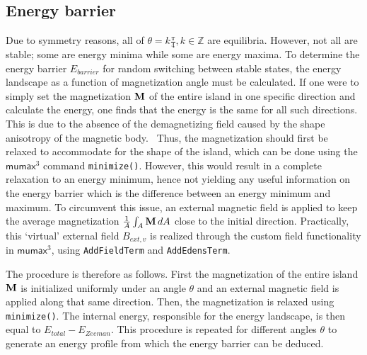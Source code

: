 \documentclass[12pt,a4paper]{article}
\newcommand{\code}[1]{\texttt{#1}}
\newcommand{\mumax}{$\mathsf{mumax}^3$}
\begin{document}
\subsection{Energy barrier}
Due to symmetry reasons, all of $\theta = k\frac{\pi}{4} , k\in\mathbb{Z}$ are equilibria. However, not all are stable; some are energy minima while some are energy maxima. To determine the energy barrier $E_{barrier}$ for random switching between stable states, the energy landscape as a function of magnetization angle must be calculated. If one were to simply set the magnetization $\vb{M}$ of the entire island in one specific direction and calculate the energy, one finds that the energy is the same for all such directions. This is due to the absence of the demagnetizing field caused by the shape anisotropy of the magnetic body.~\cite{Nonmonotonic_reversal} Thus, the magnetization should first be relaxed to accommodate for the shape of the island, which can be done using the \mumax{} command \code{minimize()}. However, this would result in a complete relaxation to an energy minimum, hence not yielding any useful information on the energy barrier which is the difference between an energy minimum and maximum. To circumvent this issue, an external magnetic field is applied to keep the average magnetization $\frac{1}{A}\int_A \vb{M}\,dA$ close to the initial direction. Practically, this `virtual' external field $B_{ext,v}$ is realized through the custom field functionality in \mumax{}, using \code{AddFieldTerm} and \code{AddEdensTerm}. \par
The procedure is therefore as follows. First the magnetization of the entire island $\vb{M}$ is initialized uniformly under an angle $\theta$ and an external magnetic field is applied along that same direction. Then, the magnetization is relaxed using \code{minimize()}. The internal energy, responsible for the energy landscape, is then equal to $E_{total} - E_{Zeeman}$. This procedure is repeated for different angles $\theta$ to generate an energy profile from which the energy barrier can be deduced.
\end{document}
